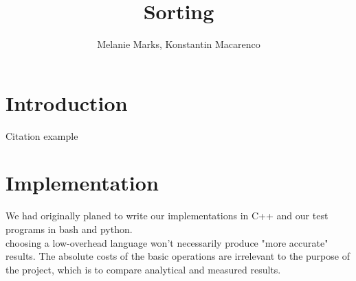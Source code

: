 \documentclass{article}
\title{Sorting}
\author{
    Melanie Marks, Konstantin Macarenco\\
}
\begin{document}
\maketitle
\thispagestyle{plain}
\pagestyle{plain}
\begin{abstract}

\end{abstract}
\tableofcontents
\section{Introduction}\label{sec:intro}
Citation example\cite{ABOOK}


\pagebreak
\section{Implementation}\label{sec:Implementation}
We had originally planed to write our implementations in C++ and our test programs in bash and python.  \\
choosing a low-overhead language won't necessarily produce "more accurate" results.  The absolute costs of the basic operations are irrelevant to the purpose of the project, which is to compare analytical and measured results.
\end{document}
